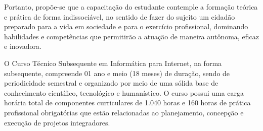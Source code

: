 \documentclass[
	12pt,				%
	openright,			%
	twoside,			%
	a4paper,			%
	chapter=TITLE,		%
	english,			%
	french,				%
	spanish,			%
	brazil,				%
	]{abntex2}
\begin{document}
Portanto, propõe-se que a capacitação do estudante contemple a formação teórica e prática de forma indissociável, no sentido de fazer do sujeito um cidadão preparado para a vida em sociedade e para o exercício profissional, dominando habilidades e competências que permitirão a atuação de maneira autônoma, eficaz e inovadora.

O Curso Técnico Subsequente em Informática para Internet, na forma subsequente, compreende 01 ano e meio (18 meses) de duração, sendo de periodicidade semestral e organizado por meio de uma sólida base de conhecimento científico, tecnológico e humanístico. O curso possui uma carga horária total de componentes curriculares de 1.040 horas e 160 horas de prática profissional obrigatórias que estão relacionadas ao planejamento, concepção e execução de projetos integradores.
\end{document}
